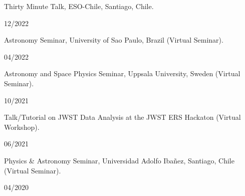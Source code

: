 \documentclass[12pt, a4paper]{article} %
\begin{document}
\begin{minipage}[t]{0.7\textwidth}
\begin{flushleft}%
  \setlength{\leftskip}{0.2cm}%
Thirty Minute Talk, ESO-Chile, Santiago, Chile.
\end{flushleft}
\end{minipage}
\begin{minipage}[t]{0.3\textwidth}
\hfill 12/2022
\end{minipage}
\vspace{0.2cm}

\begin{minipage}[t]{0.7\textwidth}
\begin{flushleft}%
  \setlength{\leftskip}{0.2cm}%
Astronomy Seminar, University of Sao Paulo, Brazil (Virtual Seminar).
\end{flushleft}
\end{minipage}
\begin{minipage}[t]{0.3\textwidth}
\hfill 04/2022
\end{minipage}
\vspace{0.2cm}

\begin{minipage}[t]{0.7\textwidth}
\begin{flushleft}%
  \setlength{\leftskip}{0.2cm}%
Astronomy and Space Physics Seminar, Uppsala University, Sweden (Virtual Seminar).
\end{flushleft}
\end{minipage}
\begin{minipage}[t]{0.3\textwidth}
\hfill 10/2021
\end{minipage}
\vspace{0.2cm}

\begin{minipage}[t]{0.7\textwidth}
\begin{flushleft}%
  \setlength{\leftskip}{0.2cm}%
Talk/Tutorial on JWST Data Analysis at the JWST ERS Hackaton (Virtual Workshop).
\end{flushleft}
\end{minipage}
\begin{minipage}[t]{0.3\textwidth}
\hfill 06/2021
\end{minipage}
\vspace{0.2cm}

\begin{minipage}[t]{0.7\textwidth}
\begin{flushleft}%
  \setlength{\leftskip}{0.2cm}%
Physics \& Astronomy Seminar, Universidad Adolfo Iba\~nez, Santiago, Chile (Virtual Seminar).
\end{flushleft}
\end{minipage}
\begin{minipage}[t]{0.3\textwidth}
\hfill 04/2020
\end{minipage}
\vspace{0.2cm}
\end{document}
